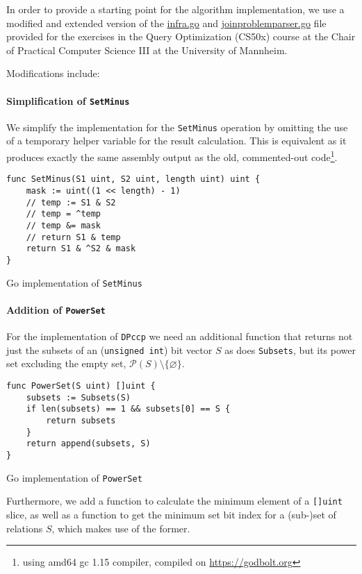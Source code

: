 In order to provide a starting point for the algorithm implementation, we use a modified and extended version of the \url{infra.go} and \url{joinproblemparser.go} file provided for the exercises in the Query Optimization (CS50x) course \texttt{} at the Chair of Practical Computer Science III at the University of Mannheim.

Modifications include:
\paragraph{Simplification of \texttt{SetMinus}}
We simplify the implementation for the \texttt{SetMinus} operation by omitting the use of a temporary helper variable for the result calculation. This is equivalent as it produces exactly the same assembly output as the old, commented-out code\footnote{using amd64 gc 1.15 compiler, compiled on \url{https://godbolt.org}}.

\begin{algorithm}
\begin{verbatim}
func SetMinus(S1 uint, S2 uint, length uint) uint {
    mask := uint((1 << length) - 1)
    // temp := S1 & S2
    // temp = ^temp
    // temp &= mask
    // return S1 & temp
    return S1 & ^S2 & mask
}
\end{verbatim}
\caption{Go implementation of \texttt{SetMinus}}
\label{alg:implementation-setminus}
\end{algorithm}

\paragraph{Addition of \texttt{PowerSet}}
For the implementation of \texttt{DPccp} we need an additional function that returns not just the subsets of an (\texttt{unsigned int}) bit vector $S$ as does \texttt{Subsets}, but its power set excluding the empty set, $\mathcal P(S)\setminus\{\varnothing\}$.

\begin{algorithm}
\begin{verbatim}
func PowerSet(S uint) []uint {
    subsets := Subsets(S)
    if len(subsets) == 1 && subsets[0] == S {
        return subsets
    }
    return append(subsets, S)
}
\end{verbatim}
\caption{Go implementation of \texttt{PowerSet}}
\label{alg:implementation-powerset}
\end{algorithm}

Furthermore, we add a function to calculate the minimum element of a \texttt{[]uint} slice, as well as a function to get the minimum set bit index for a (sub-)set of relations $S$, which makes use of the former.

